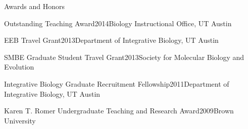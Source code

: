 \documentclass{resume} %
\begin{document}
\vspace*{0.5cm}
\begin{rSection}{Awards and Honors}
\vspace*{0.25cm}



\begin{rSubsection}{Outstanding Teaching Award}{2014}{Biology Instructional Office, UT Austin}{}
\end{rSubsection}

\begin{rSubsection}{EEB Travel Grant}{2013}{Department of Integrative Biology, UT Austin}{}
\end{rSubsection}

\begin{rSubsection}{SMBE Graduate Student Travel Grant}{2013}{Society for Molecular Biology and Evolution}{}
\end{rSubsection}

\begin{rSubsection}{Integrative Biology Graduate Recruitment Fellowship}{2011}{Department of Integrative Biology, UT Austin}{}
\end{rSubsection}

\begin{rSubsection}{Karen T. Romer Undergraduate Teaching and Research Award}{2009}{Brown University}{}
\end{rSubsection}


\end{rSection}
\end{document}
